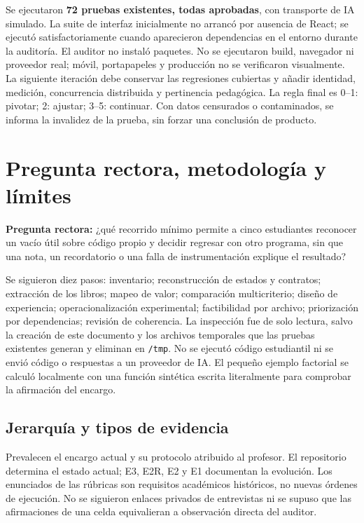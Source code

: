 \documentclass[11pt,a4paper]{report}
\begin{document}
Se ejecutaron \textbf{72 pruebas existentes, todas aprobadas}, con transporte de IA simulado. La suite de interfaz inicialmente no arrancó por ausencia de React; se ejecutó satisfactoriamente cuando aparecieron dependencias en el entorno durante la auditoría. El auditor no instaló paquetes. No se ejecutaron build, navegador ni proveedor real; móvil, portapapeles y producción no se verificaron visualmente. La siguiente iteración debe conservar las regresiones cubiertas y añadir identidad, medición, concurrencia distribuida y pertinencia pedagógica. La regla final es 0--1: pivotar; 2: ajustar; 3--5: continuar. Con datos censurados o contaminados, se informa la invalidez de la prueba, sin forzar una conclusión de producto.

\chapter{Pregunta rectora, metodología y límites}
\label{ch:metodo}
\textbf{Pregunta rectora:} ¿qué recorrido mínimo permite a cinco estudiantes reconocer un vacío útil sobre código propio y decidir regresar con otro programa, sin que una nota, un recordatorio o una falla de instrumentación explique el resultado?

Se siguieron diez pasos: inventario; reconstrucción de estados y contratos; extracción de los libros; mapeo de valor; comparación multicriterio; diseño de experiencia; operacionalización experimental; factibilidad por archivo; priorización por dependencias; revisión de coherencia. La inspección fue de solo lectura, salvo la creación de este documento y los archivos temporales que las pruebas existentes generan y eliminan en \nolinkurl{/tmp}. No se ejecutó código estudiantil ni se envió código o respuestas a un proveedor de IA. El pequeño ejemplo factorial se calculó localmente con una función sintética escrita literalmente para comprobar la afirmación del encargo.

\section{Jerarquía y tipos de evidencia}
Prevalecen el encargo actual y su protocolo atribuido al profesor. El repositorio determina el estado actual; E3, E2R, E2 y E1 documentan la evolución. Los enunciados de las rúbricas son requisitos académicos históricos, no nuevas órdenes de ejecución. No se siguieron enlaces privados de entrevistas ni se supuso que las afirmaciones de una celda equivalieran a observación directa del auditor.
\end{document}
